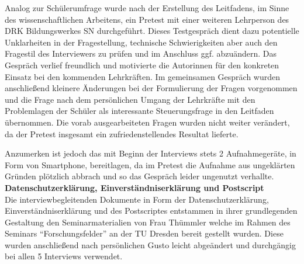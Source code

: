 Analog zur Schülerumfrage wurde nach der Erstellung des Leitfadens, im Sinne des wissenschaftlichen Arbeitens, ein Pretest mit einer weiteren Lehrperson des DRK Bildungswerkes SN durchgeführt. Dieses Testgespräch dient dazu potentielle Unklarheiten in der Fragestellung, technische Schwierigkeiten aber auch den Fragestil des Interviewers zu prüfen und im Anschluss ggf. abzuändern. Das Gespräch verlief freundlich und motivierte die Autorinnen für den konkreten Einsatz bei den kommenden Lehrkräften. Im gemeinsamen Gespräch wurden anschließend kleinere Änderungen bei der Formulierung der Fragen vorgenommen und die Frage nach dem persönlichen Umgang der Lehrkräfte mit den Problemlagen der Schüler als interessante Steuerungsfrage in den Leitfaden übernommen. Die vorab ausgearbeiteten Fragen wurden nicht weiter verändert, da der Pretest insgesamt ein zufriedenstellendes Resultat lieferte. 

Anzumerken ist jedoch das mit Beginn der Interviews stets 2 Aufnahmegeräte, in Form von Smartphone, bereitlagen, da im Pretest die Aufnahme aus ungeklärten Gründen plötzlich abbrach und so das Gespräch leider ungenutzt verhallte.\\

\textbf{Datenschutzerklärung, Einverständniserklärung und  Postscript}\\

Die interviewbegleitenden Dokumente in Form der Datenschutzerklärung, Einverständniserklärung und des Postscriptes entstammen in ihrer grundlegenden Gestaltung den Seminarmaterialien von Frau Thümmler welche im Rahmen des Seminars "`Forschungsfelder"' an der TU Dresden bereit gestellt wurden. Diese wurden anschließend nach persönlichen Gusto leicht abgeändert und durchgängig bei allen 5 Interviews verwendet.


	










